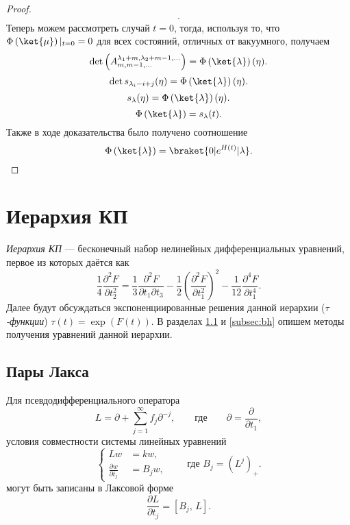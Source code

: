 \documentclass[a4paper,14pt]{extarticle}
\numberwithin{equation}{section}
\begin{document}
\begin{proof}
\begin{multline}
.\end{multline}
Теперь можем рассмотреть случай $t=0$, тогда, используя то, что
$\Phi\left( \ket{\mu} \right)|_{t=0} =0$ для всех состояний, отличных от вакуумного, получаем
\[
\det\left( A_{m,m-1,\ldots}^{\lambda_1+m,\lambda_2+m-1,\ldots}
	\right) =\Phi\left( \ket{\lambda} \right) (\eta).\] 
\[
\det  
s_{\lambda_i-i+j}(\eta)
 =\Phi\left( \ket{\lambda} \right) (\eta) 
.\] 
\[
	s_{\lambda}(\eta)
 =\Phi\left( \ket{\lambda} \right) (\eta) 
.\]
\[
 \Phi\left( \ket{\lambda} \right) =
	s_{\lambda}(t)
.\]
Также в ходе доказательства было получено соотношение
\[
\Phi\left( \ket{\lambda} \right) =\braket{0 | e^{H(t)} | \lambda}
.\] 
\end{proof}
\section{Иерархия КП}
\emph{Иерархия КП} --- бесконечный набор нелинейных дифференциальных
уравнений, первое из которых даётся как
\begin{equation}
\frac{1}{4} \frac{\partial ^2F}{\partial t_2^2} =
\frac{1}{3} \frac{\partial ^2 F}{\partial t_1 \partial t_3} 
-\frac{1}{2} \left( \frac{\partial ^2 F}{\partial t_1^2}  \right) ^2 -\frac{1}{12} \frac{\partial ^4F}{\partial t_1^4} 
\label{eq:FKP}
.\end{equation} 
Далее будут обсуждаться экспоненциированные решения
данной иерархии ($\tau$\emph{-функции}) $\tau\left( t \right) =\exp \left( F(t) \right) $.
В разделах \ref{subsec:lp} и \ref{subsec:bh}
опишем методы получения уравнений данной
иерархии. \subsection{Пары Лакса}
\label{subsec:lp}
Для псевдодифференциального оператора
	\begin{equation}
L=\partial + \sum_{j=1}^{\infty} f_j \partial^{-j},\qquad
\text{где}\qquad \partial = \frac{\partial }{\partial t_1},
\end{equation} 
условия совместности системы линейных уравнений
\begin{equation}
\left\{
\begin{aligned}
Lw&= kw, \\
\frac{\partial w}{\partial t_j} &=  B_j w,
\end{aligned}
\right.\qquad\text{где }
B_j=\left( L^j \right) _+.
\end{equation} 
могут быть записаны в Лаксовой форме
\begin{equation}
	\frac{\partial L}{\partial t_j} =\left[ 
	B_j,\,L\right] 
.\end{equation} 
\end{document}
